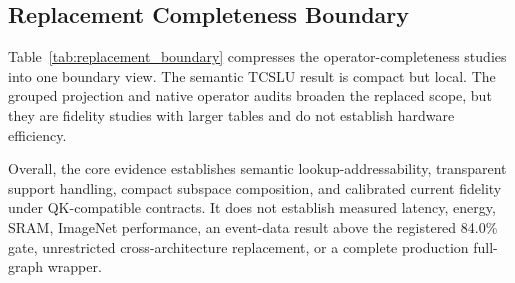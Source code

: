 \subsection{Replacement Completeness Boundary}
\label{sec:replacement_boundary}

Table~\ref{tab:replacement_boundary} compresses the operator-completeness
studies into one boundary view. The semantic TCSLU result is compact but local.
The grouped projection and native operator audits broaden the replaced scope,
but they are fidelity studies with larger tables and do not establish hardware
efficiency.

\begin{table}[t]
\centering
\footnotesize
{}
\caption{Replacement-completeness boundary. Footprints are analytical table
values, not measured SRAM or GPU memory. Detailed grouped and native operator
constructions are provided in Appendix~\ref{sec:supp_replacement}.}
\label{tab:replacement_boundary}
\end{table}

Overall, the core evidence establishes semantic lookup-addressability,
transparent support handling, compact subspace composition, and calibrated
current fidelity under QK-compatible contracts. It does not establish measured
latency, energy, SRAM, ImageNet performance, an event-data result above the
registered 84.0\% gate, unrestricted cross-architecture replacement, or a
complete production full-graph wrapper.
